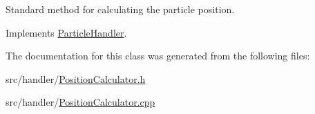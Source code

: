 Standard method for calculating the particle position. 



Implements \hyperlink{classParticleHandler_a95783831b8077d447c95ec5e2627c1fa}{Particle\+Handler}.



The documentation for this class was generated from the following files\+:\begin{DoxyCompactItemize}
\item 
src/handler/\hyperlink{PositionCalculator_8h}{Position\+Calculator.\+h}\item 
src/handler/\hyperlink{PositionCalculator_8cpp}{Position\+Calculator.\+cpp}\end{DoxyCompactItemize}

